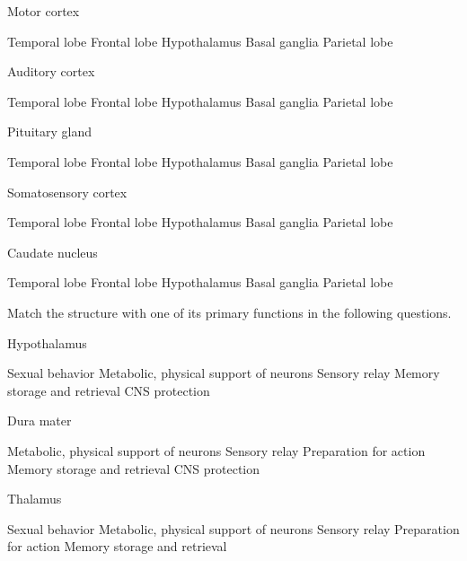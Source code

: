 \documentclass[answers]{exam}
\begin{document}
\begin{questions}
\question Motor cortex
\begin{choices}
\choice Temporal lobe
\correctchoice Frontal lobe
\choice Hypothalamus
\choice Basal ganglia
\choice Parietal lobe
\end{choices}

\question Auditory cortex
\begin{choices}
\correctchoice Temporal lobe
\choice Frontal lobe
\choice Hypothalamus
\choice Basal ganglia
\choice Parietal lobe
\end{choices}

\question Pituitary gland
\begin{choices}
\choice Temporal lobe
\choice Frontal lobe
\correctchoice Hypothalamus
\choice Basal ganglia
\choice Parietal lobe
\end{choices}

\question Somatosensory cortex
\begin{choices}
\choice Temporal lobe
\choice Frontal lobe
\choice Hypothalamus
\choice Basal ganglia
\correctchoice Parietal lobe
\end{choices}

\question Caudate nucleus
\begin{choices}
\choice Temporal lobe
\choice Frontal lobe
\choice Hypothalamus
\correctchoice Basal ganglia
\choice Parietal lobe
\end{choices}

\begin{center}
Match the structure with one of its primary functions in the following questions.
\end{center}

\question Hypothalamus
\begin{choices}
\correctchoice Sexual behavior
\choice Metabolic, physical support of neurons
\choice Sensory relay
\choice Memory storage and retrieval
\choice CNS protection
\end{choices}

\question Dura mater
\begin{choices}
\choice Metabolic, physical support of neurons
\choice Sensory relay
\choice Preparation for action
\choice Memory storage and retrieval
\correctchoice CNS protection
\end{choices}

\question Thalamus
\begin{choices}
\choice Sexual behavior
\choice Metabolic, physical support of neurons
\correctchoice Sensory relay
\choice Preparation for action
\choice Memory storage and retrieval
\end{choices}


\end{questions}
\end{document}
